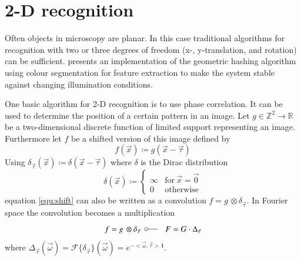 \documentclass[a4paper,12pt]{book}
\begin{document}
\section{2-D recognition}\label{cha:2drecognition}
Often objects in microscopy are planar. In this case traditional
algorithms for recognition with two or three degrees of freedom
(x-, y-translation, and rotation) can be sufficient.
\cite{RefWorks:58}
presents an implementation of the geometric hashing algorithm using colour
segmentation for feature extraction to make the system stable against changing
illumination conditions.

One basic algorithm for 2-D recognition  is to use phase correlation. It can be
used to determine the position of a certain pattern in an
image\cite{RefWorks:432}.
Let $g\in\mathbb{Z}^2\to\mathbb{R}$ be a two-dimensional discrete function of
limited support representing an image. %
Furthermore let $f$ be a shifted version of this image defined by
\begin{equation}\label{equ:shift}
  f(\vec{x})\coloneqq g(\vec{x}-\vec{\tau})
\end{equation}
Using $\delta_{\vec{\tau}}(\vec{x})\coloneqq\delta(\vec{x}-\vec{\tau})$
where $\delta$ is the Dirac distribution
\begin{equation*}
  \delta(\vec{x})\coloneqq\left\{\begin{array}{ll}
      \infty & \mathrm{for\ }\vec{x}=\vec{0}\\
      0 & \mathrm{otherwise}
    \end{array}\right.
\end{equation*}
equation \ref{equ:shift} can also be written as a convolution
$f=g\,\otimes\delta_{\vec{\tau}}$. In Fourier space the convolution
becomes a multiplication
\begin{equation*} %
  f=g\,\otimes\delta_{\vec{\tau}}\ \fourier\ F=G\cdot\Delta_{\vec{\tau}}
\end{equation*}
where $\Delta_{\vec{\tau}}(\vec{\omega})=\mathcal{F}\{\delta_{\vec{\tau}}\}(\vec{\omega})=e^{-<\vec{\omega},\vec{\tau}>\,\mathbf{i}}$.
\end{document}
